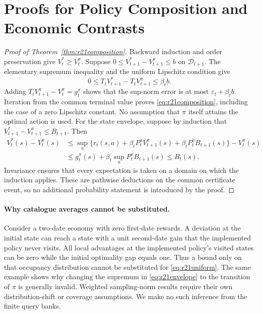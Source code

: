 \section{Proofs for Policy Composition and Economic Contrasts}\label{app:r21proofs}
\begin{proof}[Proof of Theorem~\ref{thm:r21composition}]
Backward induction and order preservation give $V_t^*\geq V_t^\pi$.
Suppose $0\leq V_{t+1}^*-V_{t+1}^\pi\leq b$ on $\mathcal D_{t+1}$.
The elementary supremum inequality and the uniform Lipschitz condition give
\[
 0\leq T_tV_{t+1}^*-T_tV_{t+1}^\pi\leq\beta_tb.
\]
Adding $T_tV_{t+1}^\pi-V_t^\pi=g_t^\pi$ shows that the sup-norm error is at
most $\varepsilon_t+\beta_tb$. Iteration from the common terminal value
proves \eqref{eq:r21composition}, including the case of a zero Lipschitz
constant. No assumption that $\pi$ itself attains the optimal action is used.
For the state envelope, suppose by induction that
$V_{t+1}^*-V_{t+1}^\pi\leq B_{t+1}$. Then
\begin{align*}
 V_t^*(s)-V_t^\pi(s)
 &\leq \sup_a\{r_t(s,a)+\beta_tP_t^aV_{t+1}^\pi(s)
                  +\beta_tP_t^aB_{t+1}(s)\}-V_t^\pi(s)\\
 &\leq g_t^\pi(s)+\beta_t\sup_aP_t^aB_{t+1}(s)
 \leq B_t(s).
\end{align*}
Invariance ensures that every expectation is taken on a domain on which the
induction applies. These are pathwise deductions on the common certificate
event, so no additional probability statement is introduced by the proof.
\end{proof}

\paragraph{Why catalogue averages cannot be substituted.}
Consider a two-date economy with zero first-date rewards. A deviation at the
initial state can reach a state with a unit second-date gain that the
implemented policy never visits. All local advantages at the implemented
policy's visited states can be zero while the initial optimality gap equals
one. Thus a bound only on that occupancy distribution cannot be substituted
for \eqref{eq:r21uniform}. The same example shows why changing the supremum
in \eqref{eq:r21envelope} to the transition of $\pi$ is generally invalid.
Weighted sampling-norm results require their own distribution-shift or
coverage assumptions. We make no such inference from the finite query banks.

